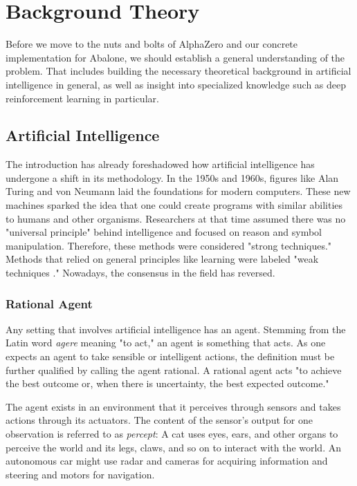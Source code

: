 \chapter{Background Theory}
\label{background-theory}
Before we move to the nuts and bolts of AlphaZero and our concrete implementation for Abalone, we should establish a general understanding of the problem. That includes building the necessary theoretical background in artificial intelligence in general, as well as insight into specialized knowledge such as deep reinforcement learning in particular.

\section{Artificial Intelligence}
The introduction has already foreshadowed how artificial intelligence has undergone a shift in its methodology. In the 1950s and 1960s, figures like Alan Turing and von Neumann laid the foundations for modern computers. These new machines sparked the idea that one could create programs with similar abilities to humans and other organisms. Researchers at that time assumed there was no "universal principle" behind intelligence and focused on reason and symbol manipulation. Therefore, these methods were considered "strong techniques." Methods that relied on general principles like learning were labeled "weak techniques ." Nowadays, the consensus in the field has reversed. \cite[cf. p. 8f.]{sutton_reinforcement_2018}


\subsection{Rational Agent}
Any setting that involves artificial intelligence has an agent. Stemming from the Latin word \textit{agere} meaning "to act," an agent is something that acts. As one expects an agent to take sensible or intelligent actions, the definition must be further qualified by calling the agent rational. A rational agent acts "to achieve the best outcome or, when there is uncertainty, the best expected outcome." \cite[p. 36]{russell_artificial_2021}

The agent exists in an environment that it perceives through sensors and takes actions through its actuators. The content of the sensor's output for one observation is referred to as \textit{percept}: A cat uses eyes, ears, and other organs to perceive the world and its legs, claws, and so on to interact with the world. An autonomous car might use radar and cameras for acquiring information and steering and motors for navigation.

